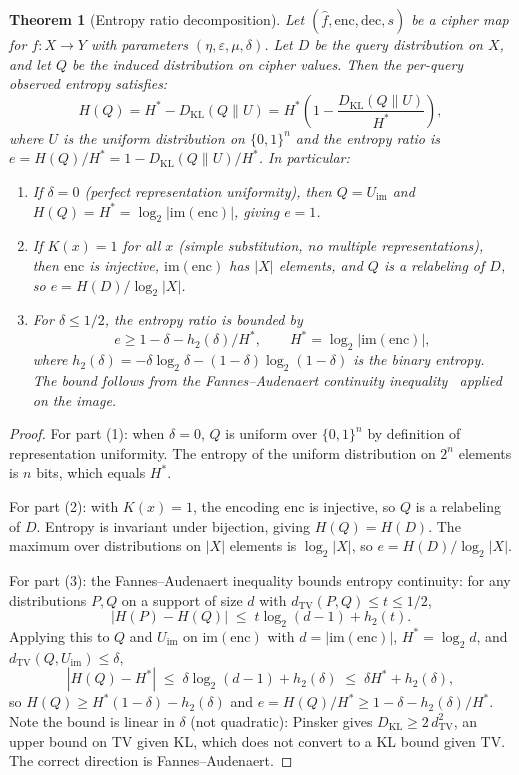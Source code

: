 \documentclass[conference]{IEEEtran}
\theoremstyle{definition}
\theoremstyle{plain}
\newtheorem{theorem}{Theorem}[section]
\theoremstyle{remark}
\newcommand{\fhat}{\hat{f}}
\newcommand{\enc}{\mathrm{enc}}
\newcommand{\dec}{\mathrm{dec}}
\newcommand{\TV}{d_{\mathrm{TV}}}
\newcommand{\B}{\{0,1\}}
\begin{document}
\begin{theorem}[Entropy ratio decomposition]
\label{thm:entropy-decomposition}
Let $(\fhat, \enc, \dec, s)$ be a cipher map for $f : X \to Y$ with
parameters $(\eta, \varepsilon, \mu, \delta)$.  Let $D$ be the query
distribution on $X$, and let $Q$ be the induced distribution on cipher
values.  Then the per-query observed entropy satisfies:
\begin{equation}
\label{eq:entropy-decomp}
H(Q) = H^* - D_{\mathrm{KL}}(Q \| U)
      = H^* \!\left(1 - \frac{D_{\mathrm{KL}}(Q \| U)}{H^*}\right),
\end{equation}
where $U$ is the uniform distribution on $\B^n$ and the entropy ratio is
$e = H(Q)/H^* = 1 - D_{\mathrm{KL}}(Q \| U)/H^*$.  In particular:
\begin{enumerate}
\item If $\delta = 0$ (perfect representation uniformity), then
  $Q = U_{\mathrm{im}}$ and $H(Q) = H^* = \log_2|\mathrm{im}(\enc)|$,
  giving $e = 1$.
\item If $K(x) = 1$ for all $x$ (simple substitution, no multiple
  representations), then $\enc$ is injective, $\mathrm{im}(\enc)$ has
  $|X|$ elements, and $Q$ is a relabeling of $D$, so
  $e = H(D) / \log_2 |X|$.
\item For $\delta \leq 1/2$, the entropy ratio is bounded by
  \[
  e \geq 1 - \delta - h_2(\delta)/H^*,
  \qquad H^* = \log_2|\mathrm{im}(\enc)|,
  \]
  where $h_2(\delta) = -\delta\log_2\delta - (1-\delta)\log_2(1-\delta)$
  is the binary entropy.  The bound follows from the Fannes--Audenaert
  continuity inequality~\cite{fannes1973continuity,audenaert2007sharp}
  applied on the image.
\end{enumerate}
\end{theorem}

\begin{proof}
For part (1): when $\delta = 0$, $Q$ is uniform over $\B^n$ by
definition of representation uniformity.  The entropy of the uniform
distribution on $2^n$ elements is $n$ bits, which equals $H^*$.

For part (2): with $K(x) = 1$, the encoding $\enc$ is injective, so $Q$
is a relabeling of $D$.  Entropy is invariant under bijection, giving
$H(Q) = H(D)$.  The maximum over distributions on $|X|$ elements is
$\log_2 |X|$, so $e = H(D) / \log_2 |X|$.

For part (3): the Fannes--Audenaert inequality bounds entropy
continuity: for any distributions $P, Q$ on a support of size $d$ with
$\TV(P, Q) \leq t \leq 1/2$,
\[
|H(P) - H(Q)| \;\leq\; t \log_2(d - 1) + h_2(t).
\]
Applying this to $Q$ and $U_{\mathrm{im}}$ on $\mathrm{im}(\enc)$ with
$d = |\mathrm{im}(\enc)|$, $H^* = \log_2 d$, and
$\TV(Q, U_{\mathrm{im}}) \leq \delta$,
\[
|H(Q) - H^*| \;\leq\; \delta \log_2(d - 1) + h_2(\delta)
                \;\leq\; \delta H^* + h_2(\delta),
\]
so $H(Q) \geq H^*(1 - \delta) - h_2(\delta)$ and
$e = H(Q)/H^* \geq 1 - \delta - h_2(\delta)/H^*$.
Note the bound is linear in $\delta$ (not quadratic):
Pinsker gives $D_{\mathrm{KL}} \geq 2\,\TV^2$, an upper bound on TV
given KL, which does not convert to a KL bound given TV.  The correct
direction is Fannes--Audenaert.
\end{proof}
\end{document}
